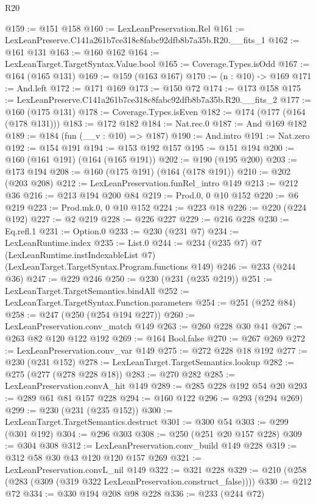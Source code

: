 \begin{lexlean}{R20}
\begin{coremodule}
@159 := @151 @158
@160 := LexLeanPreservation.Rel
@161 := LexLeanPreserve.C141a261b7ce318c8fabc92dfb8b7a35b.R20.__fits_1
@162 := @161 @131
@163 := @160 @162
@164 := LexLeanTarget.TargetSyntax.Value.bool
@165 := Coverage.Types.isOdd
@167 := @164 (@165 @131)
@169 := @159 (@163 @167)
@170 := (n : @10) -> @169
@171 := And.left
@172 := @171 @169
@173 := @150 @72
@174 := @173 @158
@175 := LexLeanPreserve.C141a261b7ce318c8fabc92dfb8b7a35b.R20.__fits_2
@177 := @160 (@175 @131)
@178 := Coverage.Types.isEven
@182 := @174 (@177 (@164 (@178 @131)))
@183 := @172 @182
@184 := Nat.rec.{0}
@187 := And @169 @182
@189 := @184 (fun (__v : @10) => @187)
@190 := And.intro
@191 := Nat.zero
@192 := @154 @191
@194 := @153 @192 @157
@195 := @151 @194
@200 := @160 (@161 @191) (@164 (@165 @191))
@202 := @190 (@195 @200)
@203 := @173 @194
@208 := @160 (@175 @191) (@164 (@178 @191))
@210 := @202 (@203 @208)
@212 := LexLeanPreservation.funRel_intro @149
@213 := @212 @36
@216 := @213 @194 @200 @84
@219 := Prod.{0, 0} @10 @152
@220 := @6 @219
@223 := Prod.mk.{0, 0} @10 @152
@224 := @223 @18
@226 := @220 (@224 @192)
@227 := @2 @219
@228 := @226 @227
@229 := @216 @228
@230 := Eq.refl.{1}
@231 := Option.{0}
@233 := @230 (@231 @7)
@234 := LexLeanRuntime.index
@235 := List.{0}
@244 := @234
    (@235 @7)
    @7
    (LexLeanRuntime.instIndexableList @7)
    (LexLeanTarget.TargetSyntax.Program.functions @149)
@246 := @233 (@244 @36)
@247 := @229 @246
@250 := @230 (@231 (@235 @219))
@251 := LexLeanTarget.TargetSemantics.bindAll
@252 := LexLeanTarget.TargetSyntax.Function.parameters
@254 := @251 (@252 @84)
@258 := @247 (@250 (@254 @194 @227))
@260 := LexLeanPreservation.conv_match @149
@263 := @260 @228 @30 @41
@267 := @263 @82 @120 @122 @192
@269 := @164 Bool.false
@270 := @267 @269
@272 := LexLeanPreservation.conv_var @149
@275 := @272 @228 @18 @192
@277 := @230 (@231 @152)
@278 := LexLeanTarget.TargetSemantics.lookup
@282 := @275 (@277 (@278 @228 @18))
@283 := @270 @282
@285 := LexLeanPreservation.convA_hit @149
@289 := @285 @228 @192 @54 @20
@293 := @289 @61 @81 @157 @228
@294 := @160 @122
@296 := @293 (@294 @269)
@299 := @230 (@231 (@235 @152))
@300 := LexLeanTarget.TargetSemantics.destruct
@301 := @300 @54
@303 := @299 (@301 @192)
@304 := @296 @303
@308 := @250 (@251 @20 @157 @228)
@309 := @304 @308
@312 := LexLeanPreservation.conv_build @149 @228
@319 := @312 @58 @30 @43 @120 @120 @157 @269
@321 := LexLeanPreservation.convL_nil @149
@322 := @321 @228
@329 := @210 (@258 (@283 (@309 (@319 @322 LexLeanPreservation.construct_false))))
@330 := @212 @72
@334 := @330 @194 @208 @98 @228
@336 := @233 (@244 @72)

\end{coremodule}
\end{lexlean}
